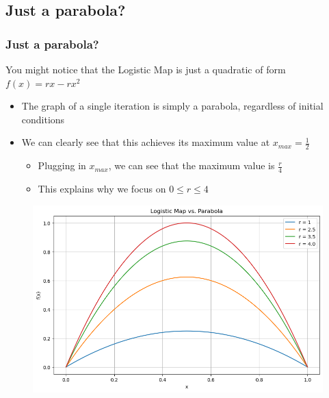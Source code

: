 \documentclass[
	11pt, %
]{beamer}
\begin{document}
\subsection{Just a parabola?}
\begin{frame}
	\frametitle{Just a parabola?}
 		You might notice that the Logistic Map is just a quadratic of form $f(x)=rx-rx^2$
	\begin{itemize}
		\item
  The graph of a single iteration is simply a parabola, regardless of initial conditions
        \item 
        We can clearly see that this achieves its maximum value at $x_{max}=\frac{1}{2}$
        \begin{itemize}
            \item Plugging in $x_{max}$, we can see that the maximum value is $\frac{r}{4}$
            \item This explains why we focus on $0\leq r\leq 4$
        \end{itemize}

	\end{itemize}
	\begin{figure}
	\includegraphics[scale=0.25]{./figures/parabolas}
	\end{figure}
\end{frame}
\end{document}
